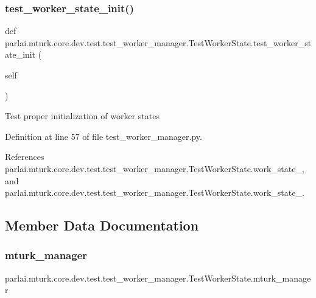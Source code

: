 \subsubsection{\texorpdfstring{test\+\_\+worker\+\_\+state\+\_\+init()}{test\_worker\_state\_init()}}
{\footnotesize\ttfamily def parlai.\+mturk.\+core.\+dev.\+test.\+test\+\_\+worker\+\_\+manager.\+Test\+Worker\+State.\+test\+\_\+worker\+\_\+state\+\_\+init (\begin{DoxyParamCaption}\item[{}]{self }\end{DoxyParamCaption})}

\begin{DoxyVerb}Test proper initialization of worker states\end{DoxyVerb}
 

Definition at line 57 of file test\+\_\+worker\+\_\+manager.\+py.



References parlai.\+mturk.\+core.\+dev.\+test.\+test\+\_\+worker\+\_\+manager.\+Test\+Worker\+State.\+work\+\_\+state\+\_, and parlai.\+mturk.\+core.\+dev.\+test.\+test\+\_\+worker\+\_\+manager.\+Test\+Worker\+State.\+work\+\_\+state\+\_.



\subsection{Member Data Documentation}
\mbox{\label{classparlai_1_1mturk_1_1core_1_1dev_1_1test_1_1test__worker__manager_1_1TestWorkerState_a59aa4c95511aa708f373f98b624c2040}} 
\subsubsection{\texorpdfstring{mturk\+\_\+manager}{mturk\_manager}}
{\footnotesize\ttfamily parlai.\+mturk.\+core.\+dev.\+test.\+test\+\_\+worker\+\_\+manager.\+Test\+Worker\+State.\+mturk\+\_\+manager}



